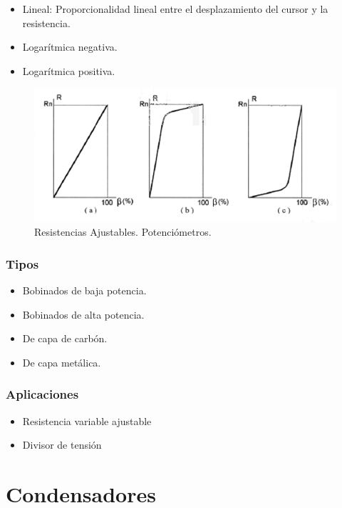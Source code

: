 \begin{itemize}
    \item Lineal: Proporcionalidad lineal entre el desplazamiento del cursor y la resistencia.
    \item Logarítmica negativa.
    \item Logarítmica positiva.
\end{itemize}

\begin{figure}[H]
    \centering
    \includegraphics[width=0.75\linewidth]{Imagenes/Resistncias Potenciometros - Respuestas.png}
    \caption{Resistencias Ajustables. Potenciómetros.}
\end{figure}

\subsubsection{Tipos}

\begin{itemize}
    \item Bobinados de baja potencia.
    \item Bobinados de alta potencia.
    \item De capa de carbón.
    \item De capa metálica.
\end{itemize}

\subsubsection{Aplicaciones}

\begin{itemize}
    \item Resistencia variable ajustable
    \item Divisor de tensión
\end{itemize}

\section{Condensadores}

